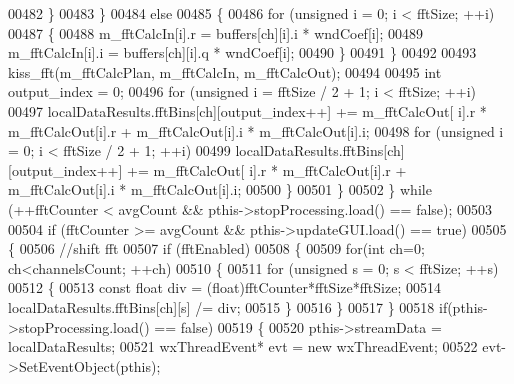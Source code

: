 \begin{DoxyCode}
{{{00482                         \}
00483                     \}
00484                     \textcolor{keywordflow}{else}
00485                     \{
00486                         \textcolor{keywordflow}{for} (\textcolor{keywordtype}{unsigned} i = 0; i < fftSize; ++i)
00487                         \{
00488                             m\_fftCalcIn[i].r = buffers[ch][i].i * wndCoef[i];
00489                             m\_fftCalcIn[i].i = buffers[ch][i].q * wndCoef[i];
00490                         \}
00491                     \}
00492 
00493                     kiss\_fft(m\_fftCalcPlan, m\_fftCalcIn, m\_fftCalcOut);
00494 
00495                     \textcolor{keywordtype}{int} output\_index = 0;
00496                     \textcolor{keywordflow}{for} (\textcolor{keywordtype}{unsigned} i = fftSize / 2 + 1; i < fftSize; ++i)
00497                         localDataResults.fftBins[ch][output\_index++] += m\_fftCalcOut[
      i].r * m\_fftCalcOut[i].r + m\_fftCalcOut[i].i * m\_fftCalcOut[i].i;
00498                     for (\textcolor{keywordtype}{unsigned} i = 0; i < fftSize / 2 + 1; ++i)
00499                         localDataResults.fftBins[ch][output\_index++] += m\_fftCalcOut[
      i].r * m\_fftCalcOut[i].r + m\_fftCalcOut[i].i * m\_fftCalcOut[i].i;
00500                 \}
00501             \}
00502         \} \textcolor{keywordflow}{while} (++fftCounter < avgCount && pthis->stopProcessing.load() == \textcolor{keyword}{false});
00503 
00504         \textcolor{keywordflow}{if} (fftCounter >= avgCount && pthis->updateGUI.load() == \textcolor{keyword}{true})
00505         \{
00506             \textcolor{comment}{//shift fft}
00507             \textcolor{keywordflow}{if} (fftEnabled)
00508             \{
00509                 \textcolor{keywordflow}{for}(\textcolor{keywordtype}{int} ch=0; ch<channelsCount; ++ch)
00510                 \{
00511                     \textcolor{keywordflow}{for} (\textcolor{keywordtype}{unsigned} s = 0; s < fftSize; ++s)
00512                     \{
00513                         \textcolor{keyword}{const} \textcolor{keywordtype}{float} div = (float)fftCounter*fftSize*fftSize;
00514                         localDataResults.fftBins[ch][s] /= div;
00515                     \}
00516                 \}
00517             \}
00518             \textcolor{keywordflow}{if}(pthis->stopProcessing.load() == \textcolor{keyword}{false})
00519             \{
00520                 pthis->streamData = localDataResults;
00521                 wxThreadEvent* evt = \textcolor{keyword}{new} wxThreadEvent;
00522                 evt->SetEventObject(pthis);
}}}
\end{DoxyCode}
